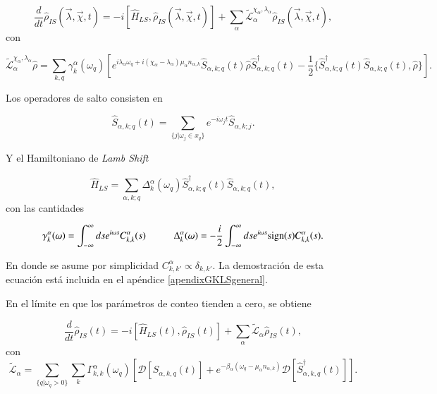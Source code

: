 \begin{equation*}
    \frac{d}{dt}\hat{\rho}_{IS}(\vec{\lambda},\vec{\chi},t) = -i[\hat{H}_{LS},\hat{\rho}_{IS}(\vec{\lambda},\vec{\chi},t)] + \sum_{\alpha}\tilde{\mathcal{L}}^{\chi_{\alpha},\lambda_{\alpha}}_{\alpha} \hat{\rho}_{IS}(\vec{\lambda},\vec{\chi},t),
\end{equation*}
con

\begin{equation*}
    \tilde{\mathcal{L}}^{\chi_{\alpha},\lambda_{\alpha}}_{\alpha}\hat{\rho} = \sum_{k,q}\gamma^{\alpha}_{k}(\omega_{q}) \left[e^{i\lambda_{\alpha}\omega_{q} + i(\chi_{\alpha}-\lambda_{\alpha})\mu_{\alpha}n_{\alpha,k}}\hat{S}_{\alpha,k;q}(t)\hat{\rho}\hat{S}^{\dagger}_{\alpha,k;q}(t) - \frac{1}{2}\{\hat{S}^{\dagger}_{\alpha,k;q}(t)\hat{S}_{\alpha,k;q}(t),\hat{\rho} \} \right].
\end{equation*}

Los operadores de salto consisten en

\begin{equation*}
    \hat{S}_{\alpha,k;q}(t) = \sum_{\{j|\omega_{j}\in x_{q} \} } e^{-i\omega_{j}t}\hat{S}_{\alpha,k;j}.
\end{equation*}

Y el Hamiltoniano de \textit{Lamb Shift}

\begin{equation*}
    \hat{H}_{LS} = \sum_{\alpha,k;q} \Delta^{\alpha}_{k}(\omega_{q}) \hat{S}^{\dagger}_{\alpha,k;q}(t)\hat{S}_{\alpha,k;q}(t),
\end{equation*}
con las cantidades

\begin{equation*}
    \gamma_{k}^{\alpha}(\omega) = \int_{-\infty}^{\infty}ds e^{i\omega s}C^{\alpha}_{k,k}(s) \hspace{10mm} \Delta^{\alpha}_{k}(\omega) = - \frac{i}{2} \int^{\infty}_{-\infty}ds e^{i\omega s} \text{sign}(s)C^{\alpha}_{k,k}(s).
\end{equation*}

En donde se asume por simplicidad $C^{\alpha}_{k,k'} \propto \delta_{k,k'}$. La demostración de esta ecuación está incluida en el apéndice \ref{apendixGKLSgeneral}. 

En el límite en que los parámetros de conteo tienden a cero, se obtiene  

\begin{equation*}
    \frac{d}{dt}\hat{\rho}_{IS}(t) = - i[\hat{H}_{LS}(t),\hat{\rho}_{IS}(t)] + \sum_{\alpha}\tilde{\mathcal{L}}_{\alpha} \hat{\rho}_{IS}(t),
\end{equation*}
con
\begin{equation*}
    \tilde{\mathcal{L}}_{\alpha} = \sum_{\{q|\omega_{q}>0\}} \sum_{k}\Gamma^{\alpha}_{k,k}(\omega_{q}) \left[ \mathcal{D}[\hat{S}_{\alpha,k,q}(t)] + e^{-\beta_{\alpha}(\omega_{q} - \mu_{\alpha}n_{\alpha,k})}\mathcal{D}[\hat{S}^{\dagger}_{\alpha,k,q}(t)]  \right].
\end{equation*}

